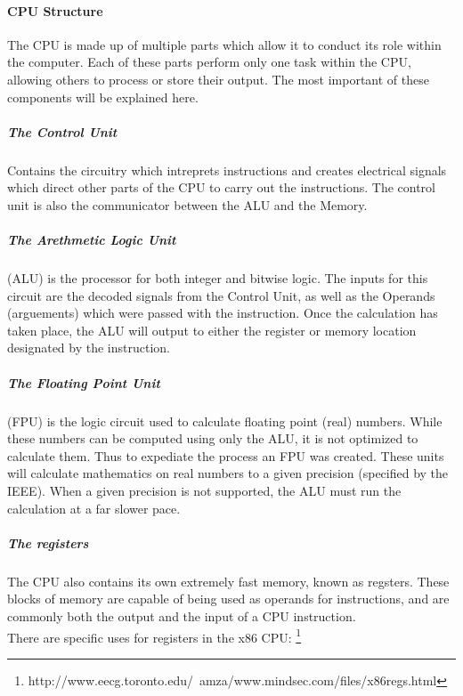 \documentclass[a4paper,11pt]{article}
\begin{document}
			\paragraph{CPU Structure}
				The CPU is made up of multiple parts which allow it to conduct its role within the computer. 
				Each of these parts perform only one task within the CPU, allowing others to process or store their output. 
				The most important of these components will be explained here. 
				\subparagraph{The Control Unit}
					Contains the circuitry which intreprets instructions and creates electrical signals which direct other parts of the CPU to carry out the instructions. 
					The control unit is also the communicator between the ALU and the Memory.
				\subparagraph{The Arethmetic Logic Unit}
					(ALU) is the processor for both integer and bitwise logic. 
					The inputs for this circuit are the decoded signals from the Control Unit, as well as the Operands (arguements) which were passed with the instruction. 
					Once the calculation has taken place, the ALU will output to either the register or memory location designated by the instruction. 
				\subparagraph{The Floating Point Unit}
					(FPU) is the logic circuit used to calculate floating point (real) numbers. 
					While these numbers can be computed using only the ALU, it is not optimized to calculate them.
					Thus to expediate the process an FPU was created. 
					These units will calculate mathematics on real numbers to a given precision (specified by the IEEE). %
					When a given precision is not supported, the ALU must run the calculation at a far slower pace. 
				\subparagraph{The registers}
					The CPU also contains its own extremely fast memory, known as regsters. 
					These blocks of memory are capable of being used as operands for instructions, and are commonly both the output and the input of a CPU instruction.\\ 
					There are specific uses for registers in the x86 CPU: \footnote{http://www.eecg.toronto.edu/~amza/www.mindsec.com/files/x86regs.html}
\end{document}
